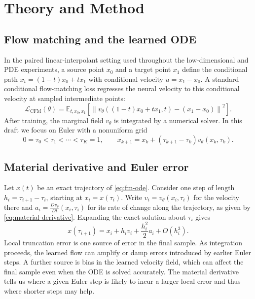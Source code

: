\section{Theory and Method}
\label{sec:method}

\subsection{Flow matching and the learned ODE}
\label{sec:flow-matching-background}

In the paired linear-interpolant setting used throughout the low-dimensional and PDE experiments,
a source point $x_0$ and a target point $x_1$ define the conditional path
$x_t=(1-t)x_0+t x_1$ with conditional velocity $u=x_1-x_0$. A standard conditional
flow-matching loss regresses the neural velocity to this conditional velocity at sampled
intermediate points:
\begin{equation}
  \mathcal{L}_{\mathrm{CFM}}(\theta)
  =
  \mathbb{E}_{t,x_0,x_1}
  \left[
    \left\|v_\theta((1-t)x_0+t x_1,t) - (x_1-x_0)\right\|^2
  \right].
  \label{eq:cfm-objective}
\end{equation}
After training, the marginal field $v_\theta$ is integrated by a numerical solver. In this draft
we focus on Euler with a nonuniform grid
\begin{equation}
  0=\tau_0 < \tau_1 < \cdots < \tau_K=1,
  \qquad
  x_{k+1}=x_k+(\tau_{k+1}-\tau_k)v_\theta(x_k,\tau_k).
  \label{eq:euler-grid}
\end{equation}

\subsection{Material derivative and Euler error}
\label{sec:material-error}

Let $x(t)$ be an exact trajectory of \cref{eq:fm-ode}. Consider one step of length
$h_i=\tau_{i+1}-\tau_i$, starting at $x_i=x(\tau_i)$. Write $v_i=v_\theta(x_i,\tau_i)$
for the velocity there and $a_i=\frac{D v_\theta}{D t}(x_i,\tau_i)$ for its rate of change
along the trajectory, as given by \cref{eq:material-derivative}. Expanding the exact solution
about $\tau_i$ gives
\begin{equation}
  x(\tau_{i+1}) = x_i + h_i v_i + \frac{h_i^2}{2}a_i + O(h_i^3).
  \label{eq:euler-expansion}
\end{equation}
Local truncation error is one source of error in the final sample. As integration proceeds,
the learned flow can amplify or damp errors introduced by earlier Euler steps. A further source
is bias in the learned velocity field, which can affect the final sample even when the ODE is
solved accurately. The material derivative tells us where a given Euler step is likely to incur
a larger local error and thus where shorter steps may help.

